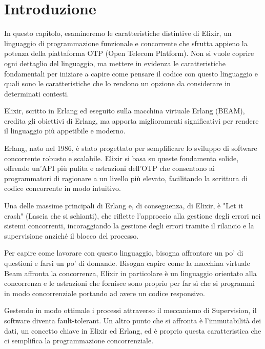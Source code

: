 \section{Introduzione}



In questo capitolo, esamineremo le caratteristiche distintive
di Elixir, un linguaggio di programmazione funzionale e
concorrente che sfrutta appieno la potenza della piattaforma
OTP (Open Telecom Platform). Non si vuole coprire ogni dettaglio
del linguaggio, ma mettere in evidenza le caratteristiche
fondamentali per iniziare a capire come pensare il codice
con questo linguaggio e quali sono le caratteristiche che
lo rendono un opzione da considerare in determinati contesti.

Elixir, scritto in Erlang ed eseguito sulla macchina virtuale
Erlang (BEAM), eredita gli obiettivi di Erlang, ma apporta
miglioramenti significativi per rendere il linguaggio più
appetibile e moderno.

Erlang, nato nel 1986, è stato progettato per semplificare
lo sviluppo di software concorrente robusto e scalabile.
Elixir si basa su queste fondamenta solide, offrendo un'API
più pulita e astrazioni dell'OTP che consentono ai programmatori
di ragionare a un livello più elevato, facilitando la scrittura
di codice concorrente in modo intuitivo.

Una delle massime principali di Erlang e, di conseguenza,
di Elixir, è "Let it crash" (Lascia che si schianti),
che riflette l'approccio alla gestione degli errori nei sistemi
concorrenti, incoraggiando la gestione degli errori tramite
il rilancio e la supervisione anziché il blocco del processo.

Per capire come lavorare con questo linguaggio, bisogna affrontare
un po' di questioni e farsi un po' di domande.
Bisogna capire come la macchina virtuale Beam affronta la concorrenza,
Elixir in particolare è un linguaggio orientato alla concorrenza e 
le astrazioni che fornisce sono proprio per far sì che
si programmi in modo concorrenziale portando ad avere un
codice responsivo. 

Gestendo in modo ottimale i processi attraverso 
il meccanismo di Supervision, il software diventa fault-tolerant.
Un altro punto che si affronta è l'immutabilità dei dati, un concetto
chiave in Elixir ed Erlang, ed è proprio questa caratteristica
che ci semplifica la programmazione concorrenziale.
